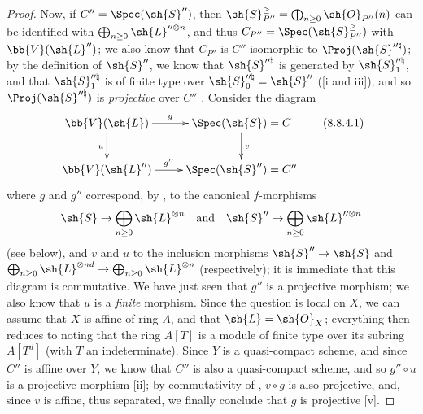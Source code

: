 \begin{proof}
Now, if $C''=\Spec(\sh{S}'')$, then $\sh{S}_{P''}^\geq=\bigoplus_{n\geq 0}\sh{O}_{P''}(n)$ can be identified with $\bigoplus_{n\geq 0}\sh{L}^{\prime\prime\otimes n}$, and thus $C_{P''}=\Spec(\sh{S}_{P''}^\geq)$ with $\bb{V}(\sh{L}'')$;
we also know  that $C_{P''}$ is $C''$-isomorphic to $\Proj(\sh{S}^{\prime\prime\natural})$;
by the definition of $\sh{S}''$, we know that $\sh{S}^{\prime\prime\natural}$ is generated by $\sh{S}_1^{\prime\prime\natural}$, and that $\sh{S}_1^{\prime\prime\natural}$ is of finite type over $\sh{S}_0^{\prime\prime\natural}=\sh{S}''$ ([i and iii]), and so $\Proj(\sh{S}^{\prime\prime\natural})$ is \emph{projective} over $C''$ .
Consider the diagram
\[
\label{II.8.8.4.1}
  \xymatrix{
    \bb{V}(\sh{L})
      \ar[r]^-{g}
      \ar[d]_{u}
  & \Spec(\sh{S}) = C
      \ar[d]^{v}
  \\\bb{V}(\sh{L}'')
      \ar[r]^-{g''}
  & \Spec(\sh{S}'') = C''
  }
  \tag{8.8.4.1}
\]
where $g$ and $g''$ correspond, by , to the canonical $f$-morphisms
\[
  \sh{S}\to\bigoplus_{n\geq0}\sh{L}^{\otimes n}
  \quad\mbox{and}\quad
  \sh{S}''\to\bigoplus_{n\geq0}\sh{L}^{\prime\prime\otimes n}
\]
 (see  below), and $v$ and $u$ to the inclusion morphisms $\sh{S}''\to\sh{S}$ and $\bigoplus_{n\geq0}\sh{L}^{\otimes nd}\to\bigoplus_{n\geq0}\sh{L}^{\otimes n}$ (respectively);
it is immediate  that this diagram is commutative.
We have just seen that $g''$ is a projective morphism;
we also know that $u$ is a \emph{finite} morphism.
Since the question is local on $X$, we can assume that $X$ is affine of ring $A$, and that $\sh{L}=\sh{O}_X$;
everything then reduces to noting that the ring $A[T]$ is a module of finite type over its subring $A[T^d]$ (with $T$ an indeterminate).
Since $Y$ is a quasi-compact scheme, and since $C''$ is affine over $Y$, we know that $C''$ is also a quasi-compact scheme,
and so $g''\circ u$ is a projective morphism [ii];
by commutativity of , $v\circ g$ is also projective, and, since $v$ is affine, thus separated, we finally conclude that $g$ is projective [v].
\end{proof}

